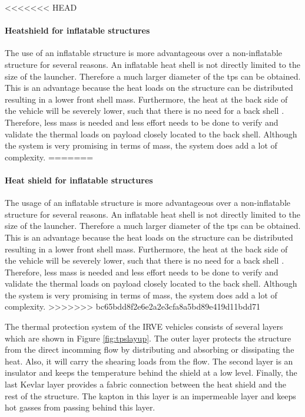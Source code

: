 <<<<<<< HEAD
\paragraph{Heatshield for inflatable structures}
The use of  an inflatable structure is more advantageous over a non-inflatable structure for several reasons. An inflatable heat shell is not directly limited to the size of the launcher. Therefore a much larger diameter of the \gls{tps} can be obtained. This is an advantage because the heat loads on the structure can be distributed resulting in a lower front shell mass. Furthermore, the heat at the back side of the vehicle will be severely lower, such that there is no need for a back shell \cite{Hughes2005}. Therefore, less mass is needed and less effort needs to be done to verify and validate the thermal loads on payload closely located to the back shell. Although the system is very promising in terms of mass, the system does add a lot of complexity. 
=======
\paragraph{Heat shield for inflatable structures}
The usage of  an inflatable structure is more advantageous over a non-inflatable structure for several reasons. An inflatable heat shell is not directly limited to the size of the launcher. Therefore a much larger diameter of the \gls{tps} can be obtained. This is an advantage because the heat loads on the structure can be distributed resulting in a lower front shell mass. Furthermore, the heat at the back side of the vehicle will be severely lower, such that there is no need for a back shell \cite{Hughes2005}. Therefore, less mass is needed and less effort needs to be done to verify and validate the thermal loads on payload closely located to the back shell. Although the system is very promising in terms of mass, the system does add a lot of complexity. 
>>>>>>> bc65bdd8f2e6e2a2e3cfa8a5bd89e419d11bdd71

The thermal protection system of the IRVE vehicles consists of several layers \cite{Litton} which are shown in Figure \ref{fig:tpslayup}. The outer layer protects the structure from the direct incomming flow by distributing and absorbing or dissipating the heat. Also, it will carry the shearing loads from the flow. The second layer is an insulator and keeps the temperature behind the shield at a low level. Finally, the last Kevlar layer provides a fabric connection between the heat shield and the rest of the structure. The kapton in this layer is an impermeable layer and keeps hot gasses from passing behind this layer.

